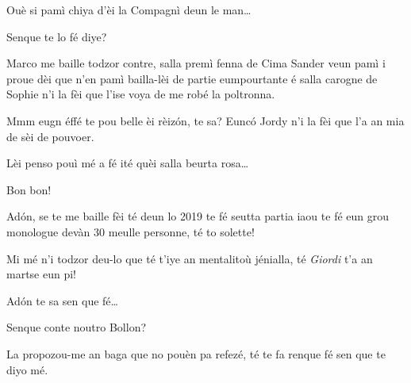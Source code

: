 \begin{drama}
\act[Acte I]

\ridoiver





\Presidanspeaks {}
Ouè si pamì chiya d'èi la Compagnì
deun le man\ldots

\Secreteospeaks Senque te lo fé diye?

\Presidanspeaks Marco me baille todzor contre, salla premì fenna de Cima Sander veun pamì i proue dèi que n’en pamì bailla-lèi de partie eumpourtante é salla carogne de Sophie n'i la fèi que l'ise voya de me robé la poltronna.

\Secreteospeaks Mmm eugn éffé te pou belle èi rèiz\'on, te sa? Eunc\'o Jordy n'i la fèi que l’a an mia de sèi de pouvoer.

\Presidanspeaks {} Lèi penso pouì mé a fé ité quèi salla beurta rosa\ldots

\Secreteospeaks Bon bon!


\Jordyspeaks {} Ad\'on, se te me baille fèi té deun lo 2019 te fé seutta partia iaou te fé eun grou monologue devàn 30 meulle personne, té to solette!

\Cimaspeaks Mi mé n'i todzor deu-lo que té t'iye an mentalitoù jénialla, té \textit{Giordi} t’a an martse eun pi!

\Jordyspeaks Ad\'on te sa sen que fé\ldots


\Marcospeaks Senque conte noutro Bollon?

\Cimaspeaks La propozou-me an baga que no pouèn pa refezé, té te fa renque fé sen que te diyo mé.



\end{drama}
